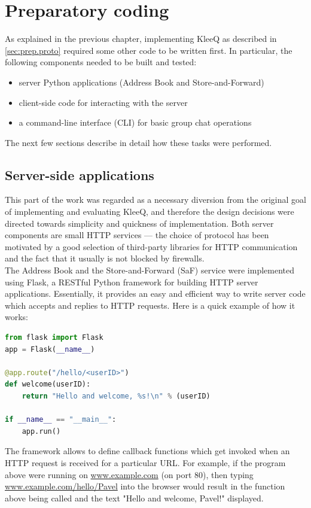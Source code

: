 \documentclass[a4paper, 12pt]{report}
\begin{document}
\section{Preparatory coding}
\label{sec:impl.prep}
As explained in the previous chapter, implementing KleeQ as described in \cref{sec:prep.proto} required some other code to be written first. In particular, the following components needed to be built and tested:
\begin{itemize}
    \item server Python applications (Address Book and Store-and-Forward)
    \item client-side code for interacting with the server
    \item a command-line interface (CLI) for basic group chat operations
\end{itemize}
The next few sections describe in detail how these tasks were performed.

\subsection{Server-side applications}
\label{subsec:impl.prep.server}
This part of the work was regarded as a necessary diversion from the original goal of implementing and evaluating KleeQ, and therefore the design decisions were directed towards simplicity and quickness of implementation. Both server components are small HTTP services --- the choice of protocol has been motivated by a good selection of third-party libraries for HTTP communication and the fact that it usually is not blocked by firewalls.\\

The Address Book and the Store-and-Forward (SaF) service were implemented using Flask, a RESTful Python framework for building HTTP server applications. Essentially, it provides an easy and efficient way to write server code which accepts and replies to HTTP requests. Here is a quick example of how it works: \\

\begin{lstlisting}[language = Python, columns=fullflexible]
from flask import Flask
app = Flask(__name__)

@app.route("/hello/<userID>")
def welcome(userID):
    return "Hello and welcome, %s!\n" % (userID)
    
if __name__ == "__main__":
    app.run()
\end{lstlisting}


The framework allows to define callback functions which get invoked when an HTTP request is received for a particular URL. For example, if the program above were running on \url{www.example.com} (on port 80), then typing \url{www.example.com/hello/Pavel} into the browser would result in the function above being called and the text "Hello and welcome, Pavel!" displayed. \\
\end{document}
